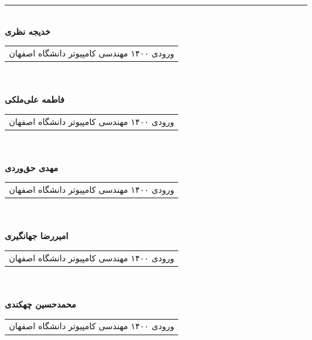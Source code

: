 \documentclass[11pt, twoside]{imsproc}
\begin{document}
\bigskip
\bigskip 

\noindent \rule{.4\linewidth}{0.8pt}\\
\noindent\footnotesize{\bfseries خدیجه نظری} \\
\begin{tabular}{p{14 cm}}
\footnotesize
ورودی ۱۴۰۰ مهندسی کامپیوتر دانشگاه اصفهان
\end{tabular}\\\\
\noindent\footnotesize{\bfseries فاطمه علی‌ملکی} \\
\begin{tabular}{p{14 cm}}
\footnotesize
ورودی ۱۴۰۰ مهندسی کامپیوتر دانشگاه اصفهان
\end{tabular}\\\\
\noindent\footnotesize{\bfseries مهدی‌ حق‌وردی} \\
\begin{tabular}{p{14 cm}}
\footnotesize
ورودی ۱۴۰۰ مهندسی کامپیوتر دانشگاه اصفهان
\end{tabular}\\\\
\noindent\footnotesize{\bfseries امیررضا جهانگیری} \\
\begin{tabular}{p{14 cm}}
\footnotesize
ورودی ۱۴۰۰ مهندسی کامپیوتر دانشگاه اصفهان
\end{tabular}\\\\
\noindent\footnotesize{\bfseries محمدحسین چهکندی} \\
\begin{tabular}{p{14 cm}}
\footnotesize
ورودی ۱۴۰۰ مهندسی کامپیوتر دانشگاه اصفهان
\end{tabular}
\end{document}
